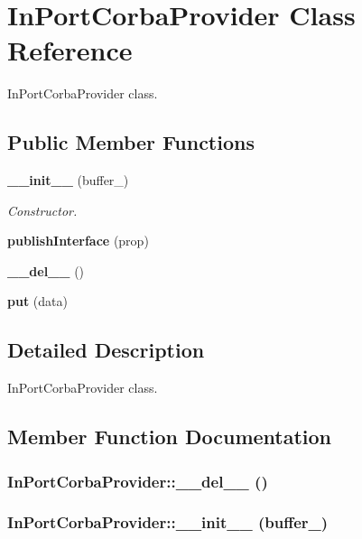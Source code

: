 \section{In\-Port\-Corba\-Provider Class Reference}
\label{classInPortCorbaProvider}
In\-Port\-Corba\-Provider class.  


\subsection*{Public Member Functions}
\begin{CompactItemize}
\item 
{\bf \_\-\_\-init\_\-\_\-} (buffer\_\-)
\begin{CompactList}\small\item\em Constructor. \item\end{CompactList}\item 
{\bf publish\-Interface} (prop)
\item 
{\bf \_\-\_\-del\_\-\_\-} ()
\item 
{\bf put} (data)
\end{CompactItemize}


\subsection{Detailed Description}
In\-Port\-Corba\-Provider class. 



\subsection{Member Function Documentation}
\subsubsection{\setlength{\rightskip}{0pt plus 5cm}In\-Port\-Corba\-Provider::\_\-\_\-del\_\-\_\- ()}\label{classInPortCorbaProvider_InPortCorbaProvidera2}


\subsubsection{\setlength{\rightskip}{0pt plus 5cm}In\-Port\-Corba\-Provider::\_\-\_\-init\_\-\_\- (buffer\_\-)}\label{classInPortCorbaProvider_InPortCorbaProvidera0}


